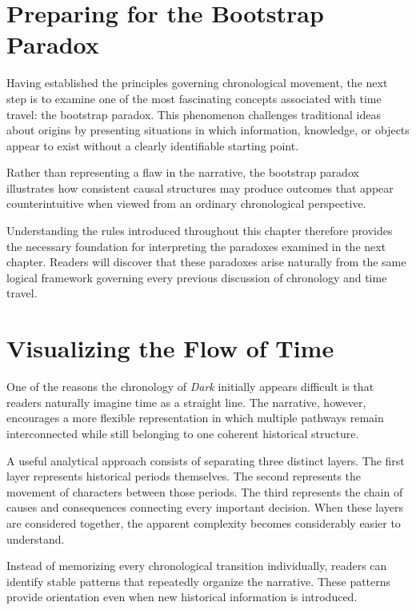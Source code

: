 \documentclass[12pt,oneside,openany]{book}
\begin{document}
\section{Preparing for the Bootstrap Paradox}

Having established the principles governing chronological movement, the next
step is to examine one of the most fascinating concepts associated with time
travel: the bootstrap paradox. This phenomenon challenges traditional ideas
about origins by presenting situations in which information, knowledge, or
objects appear to exist without a clearly identifiable starting point.

Rather than representing a flaw in the narrative, the bootstrap paradox
illustrates how consistent causal structures may produce outcomes that appear
counterintuitive when viewed from an ordinary chronological perspective.

Understanding the rules introduced throughout this chapter therefore provides
the necessary foundation for interpreting the paradoxes examined in the next
chapter. Readers will discover that these paradoxes arise naturally from the
same logical framework governing every previous discussion of chronology and
time travel.
\section{Visualizing the Flow of Time}

One of the reasons the chronology of \textit{Dark} initially appears difficult
is that readers naturally imagine time as a straight line. The narrative,
however, encourages a more flexible representation in which multiple pathways
remain interconnected while still belonging to one coherent historical
structure.

A useful analytical approach consists of separating three distinct layers.
The first layer represents historical periods themselves. The second
represents the movement of characters between those periods. The third
represents the chain of causes and consequences connecting every important
decision. When these layers are considered together, the apparent complexity
becomes considerably easier to understand.

Instead of memorizing every chronological transition individually, readers can
identify stable patterns that repeatedly organize the narrative. These patterns
provide orientation even when new historical information is introduced.
\end{document}
